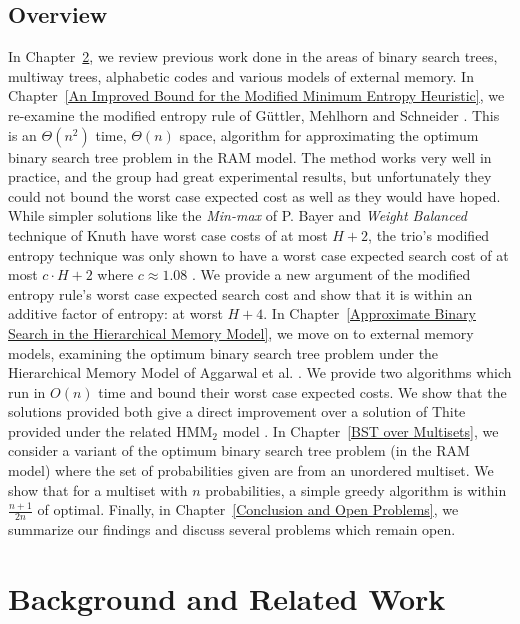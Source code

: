 \documentclass[letterpaper,12pt,titlepage,oneside,final]{book}
\theoremstyle{plain}
\begin{document}
\section{Overview}

In Chapter~\ref{Background and Related Work}, we review previous work done in the areas of binary search trees, multiway trees, alphabetic codes and various models of external memory. In Chapter~\ref{An Improved Bound for the Modified Minimum Entropy Heuristic}, we re-examine the modified entropy rule of G{\"u}ttler, Mehlhorn and Schneider \cite{guttler1980binary}. This is an $\Theta(n^2)$ time, $\Theta(n)$ space, algorithm for approximating the optimum binary search tree problem in the RAM model. The method works very well in practice, and the group had great experimental results, but unfortunately they could not bound the worst case expected cost as well as they would have hoped. While simpler solutions like the \textit{Min-max} of P. Bayer \cite{bayer1975improved} and \textit{Weight Balanced} technique of Knuth \cite{knuth1971optimum} have worst case costs of at most $H+2$, the trio's modified entropy technique was only shown to have a worst case expected search cost of at most $c\cdot H+2$ where $c \approx 1.08$ \cite{bayer1975improved, guttler1980binary}. We provide a new argument of the modified entropy rule's worst case expected search cost and show that it is within an additive factor of entropy: at worst $H+4$. In Chapter~\ref{Approximate Binary Search in the Hierarchical Memory Model}, we move on to external memory models, examining the optimum binary search tree problem under the Hierarchical Memory Model of Aggarwal et al. \cite{aggarwal1987model}. We provide two algorithms which run in $O(n)$ time and bound their worst case expected costs. We show that the solutions provided both give a direct improvement over a solution of Thite provided under the related HMM$_2$ model \cite{thite2008optimum}. In Chapter~\ref{BST over Multisets}, we consider a variant of the optimum binary search tree problem (in the RAM model) where the set of probabilities given are from an unordered multiset. We show that for a multiset with $n$ probabilities, a simple greedy algorithm is within $\frac{n+1}{2n}$ of optimal. Finally, in Chapter~\ref{Conclusion and Open Problems}, we summarize our findings and discuss several problems which remain open.


\chapter{Background and Related Work} \label{Background and Related Work}
\end{document}
